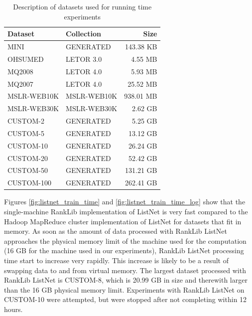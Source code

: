 \begin{table}[!h]
\centering
\begin{tabular}{p{3.4cm}p{3.4cm}r}\toprule
Dataset & Collection & Size \\
\midrule
MINI		& GENERATED		  & 143.38 KB\\
OHSUMED     & LETOR 3.0       &   4.55 MB\\
MQ2008      & LETOR 4.0       &   5.93 MB\\
MQ2007      & LETOR 4.0       &  25.52 MB\\
MSLR-WEB10K & MSLR-WEB10K     & 938.01 MB\\
MSLR-WEB30K & MSLR-WEB30K     &   2.62 GB\\
CUSTOM-2	& GENERATED		  &   5.25 GB\\
CUSTOM-5	& GENERATED		  &  13.12 GB\\
CUSTOM-10	& GENERATED		  &  26.24 GB\\
CUSTOM-20   & GENERATED       &  52.42 GB\\
CUSTOM-50	& GENERATED		  & 131.21 GB\\
CUSTOM-100	& GENERATED		  & 262.41 GB\\
\bottomrule
\end{tabular}
\caption{Description of datasets used for running time experiments}
\label{tbl:recap_datasets}
\end{table}

Figures \ref{fig:listnet_train_time} and \ref{fig:listnet_train_time_log} show that the single-machine RankLib implementation of ListNet is very fast compared to the Hadoop MapReduce cluster implementation of ListNet for datasets that fit in memory. As soon as the amount of data processed with RankLib ListNet approaches the physical memory limit of the machine used for the computation (16 GB for the machine used in our experiments), RankLib ListNet processing time start to increase very rapidly. This increase is likely to be a result of swapping data to and from virtual memory. The largest dataset processed with RankLib ListNet is CUSTOM-8, which is 20.99 GB in size and therewith larger than the 16 GB physical memory limit. Experiments with RankLib ListNet on CUSTOM-10 were attempted, but were stopped after not completing within 12 hours.\\

